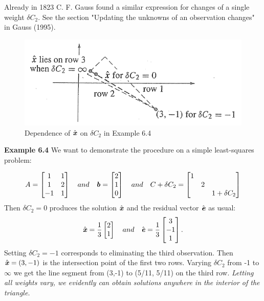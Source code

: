 Already in 1823 C. F. Gauss found a similar expression for changes of a single weight $ \delta C_{2} $. See the section "Updating the unknowns of an observation changes" in Gauss (1995).
\begin{figure}[htb]
	\centering
	\includegraphics[width=0.7\linewidth]{TeX_files/Part02/chapter06/image/6-1}
	\caption{Dependence of $ \hat{\textbf{\textit{x}}}$ on $ \delta C_{2}$ in Example 6.4}
\end{figure}

\begin{flushleft}
	\textbf{Example 6.4} We want to demonstrate the procedure on a simple least-squares problem:
\end{flushleft}
\begin{align*}
	A = 
	\begin{bmatrix}
		1&1 \\	
		1&2 \\		
	   -1&1 	
	\end{bmatrix} \quad 
and \quad 
\textbf{\textit{b}}=
\begin{bmatrix}
	2 \\	
	1 \\		
	0 	
\end{bmatrix} \quad 
and \quad 
C+\delta C_{2} =
\begin{bmatrix}
	1   &   & \\	
	&   2   & \\		
	&   &  1+\delta C_{2} 	
\end{bmatrix} 
\end{align*}
Then $ \delta C_{2} =0 $ produces the solution $\hat{\textbf{\textit{x}}}$ and the residual vector $\hat{\textbf{\textit{e}}}$ as usual:
\begin{align*}
	\hat{\textbf{\textit{x}}} = \dfrac{1}{3}
\begin{bmatrix}
	2 \\	
	1 	
\end{bmatrix} \quad 
	and \quad 
\hat{\textbf{\textit{e}}} = \dfrac{1}{3}
	\begin{bmatrix}
		3 \\	
		-1 \\
		1	
	\end{bmatrix}.
\end{align*}
Setting $\delta C_{2} =-1 $ corresponds to eliminating the third observation. Then $ \hat{\textbf{\textit{x}}} =(3,-1)$ is the intersection point of the first two rows.  Varying $\delta C_{2} $ from -1 to $ \infty$ we get the line segment from (3,-1) to (5/11, 5/11) on the third row. \textit{Letting all weights vary, we evidently can obtain solutions anywhere in the interior of the triangle.}

